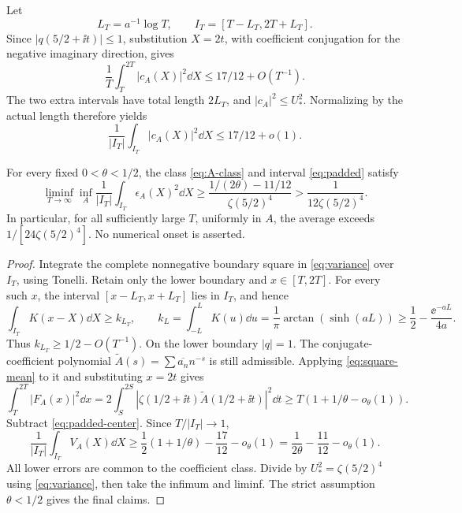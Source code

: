 Let
\begin{equation}\label{eq:padded}
 L_T=a^{-1}\log T,\qquad I_T=[T-L_T,2T+L_T].
\end{equation}
Since \(|q(5/2+\ii t)|\le1\), substitution \(X=2t\), with
coefficient conjugation for the negative imaginary direction, gives
\[
 \frac1T\int_T^{2T}|c_A(X)|^2\dd X\le17/12+O(T^{-1}).
\]
The two extra intervals have total length \(2L_T\), and
\(|c_A|^2\le U_*^2\). Normalizing by the actual length therefore yields
\begin{equation}\label{eq:padded-center}
 \frac1{|I_T|}\int_{I_T}|c_A(X)|^2\dd X\le17/12+o(1).
\end{equation}

\begin{theorem}\label{thm:floor}
For every fixed \(0<\theta<1/2\), the class \eqref{eq:A-class}
and interval \eqref{eq:padded} satisfy
\begin{equation}\label{eq:floor}
 \liminf_{T\to\infty}\inf_A
 \frac1{|I_T|}\int_{I_T}\epsilon_A(X)^2\dd X
 \ge\frac{1/(2\theta)-11/12}{\zeta(5/2)^4}
 >\frac1{12\zeta(5/2)^4}.
\end{equation}
In particular, for all sufficiently large \(T\), uniformly in \(A\),
the average exceeds \(1/[24\zeta(5/2)^4]\).
No numerical onset is asserted.
\end{theorem}
\begin{proof}
Integrate the complete nonnegative boundary square in
\eqref{eq:variance} over \(I_T\), using Tonelli.
Retain only the lower boundary and \(x\in[T,2T]\).
For every such \(x\), the interval
\([x-L_T,x+L_T]\) lies in \(I_T\), and hence
\[
 \int_{I_T}K(x-X)\dd X\ge k_{L_T},\qquad
 k_L=\int_{-L}^LK(u)\dd u=\frac1\pi\arctan(\sinh(aL))
 \ge\frac12-\frac{\ee^{-aL}}{4a}.
\]
Thus \(k_{L_T}\ge1/2-O(T^{-1})\).
On the lower boundary \(|q|=1\).
The conjugate-coefficient polynomial
\(\widetilde A(s)=\sum\overline{a_n}n^{-s}\) is still admissible.
Applying \eqref{eq:square-mean} to it and substituting \(x=2t\)
gives
\[
 \int_T^{2T}|F_A(x)|^2\dd x
 =2\int_S^{2S}|\zeta(1/2+\ii t)\widetilde A(1/2+\ii t)|^2\dd t
 \ge T(1+1/\theta-o_\theta(1)).
\]
Subtract \eqref{eq:padded-center}. Since \(T/|I_T|\to1\),
\[
 \frac1{|I_T|}\int_{I_T}V_A(X)\dd X
 \ge\frac12(1+1/\theta)-\frac{17}{12}-o_\theta(1)
 =\frac1{2\theta}-\frac{11}{12}-o_\theta(1).
\]
All lower errors are common to the coefficient class. Divide by
\(U_*^2=\zeta(5/2)^4\) using \eqref{eq:variance}, then take the
infimum and liminf. The strict assumption \(\theta<1/2\) gives
the final claims.
\end{proof}

